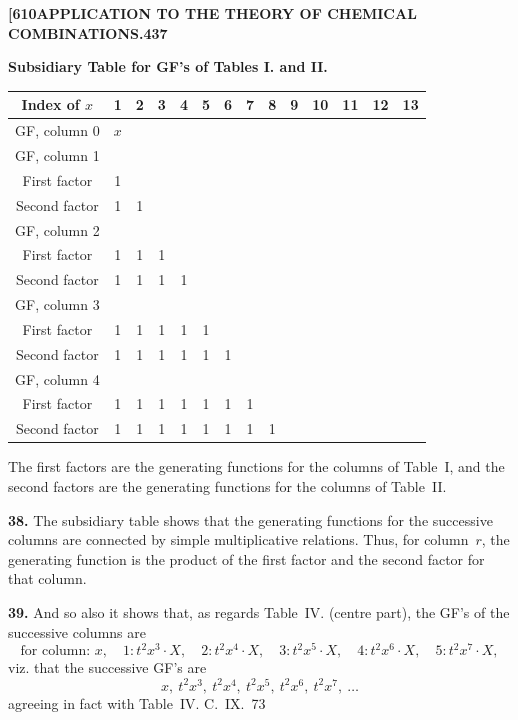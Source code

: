 \documentclass[11pt,a4paper]{article}
\begin{document}
{\newpage
\noindent\textbf{[610}\hspace{\fill}\textbf{APPLICATION TO THE THEORY OF CHEMICAL COMBINATIONS.}\hspace{\fill}\textbf{437}

\noindent\textbf{Subsidiary Table for GF's of Tables I. and II.}

\begin{center}
\small
\begin{tabular}{|c|c|c|c|c|c|c|c|c|c|c|c|c|c|}
\hline
Index of $x$ & 1 & 2 & 3 & 4 & 5 & 6 & 7 & 8 & 9 & 10 & 11 & 12 & 13 \\
\hline
GF, column 0 & $x$ & & & & & & & & & & & & \\
\hline
GF, column 1 & & & & & & & & & & & & & \\
First factor & 1 & & & & & & & & & & & & \\
Second factor & 1 & 1 & & & & & & & & & & & \\
\hline
GF, column 2 & & & & & & & & & & & & & \\
First factor & 1 & 1 & 1 & & & & & & & & & & \\
Second factor & 1 & 1 & 1 & 1 & & & & & & & & & \\
\hline
GF, column 3 & & & & & & & & & & & & & \\
First factor & 1 & 1 & 1 & 1 & 1 & & & & & & & & \\
Second factor & 1 & 1 & 1 & 1 & 1 & 1 & & & & & & & \\
\hline
GF, column 4 & & & & & & & & & & & & & \\
First factor & 1 & 1 & 1 & 1 & 1 & 1 & 1 & & & & & & \\
Second factor & 1 & 1 & 1 & 1 & 1 & 1 & 1 & 1 & & & & & \\
\hline
\end{tabular}
\end{center}

The first factors are the generating functions for the columns of Table~I, and the second factors are the generating functions for the columns of Table~II.

\medskip
\noindent\textbf{38.}
The subsidiary table shows that the generating functions for the successive columns are connected by simple multiplicative relations. Thus, for column~$r$, the generating function is the product of the first factor and the second factor for that column.

\medskip
\noindent\textbf{39.}
And so also it shows that, as regards Table~IV. (centre part), the GF's of the successive columns are
\[
\text{for column: } x,\quad 1: t^2x^3 \cdot X,\quad 2: t^2x^4 \cdot X,\quad 3: t^2x^5 \cdot X,\quad 4: t^2x^6 \cdot X,\quad 5: t^2x^7 \cdot X,
\]
viz. that the successive GF's are
\[
x,\ t^2x^3,\ t^2x^4,\ t^2x^5,\ t^2x^6,\ t^2x^7,\ \ldots
\]
agreeing in fact with Table~IV.
\hfill C.~IX.\ 73

}
\end{document}
